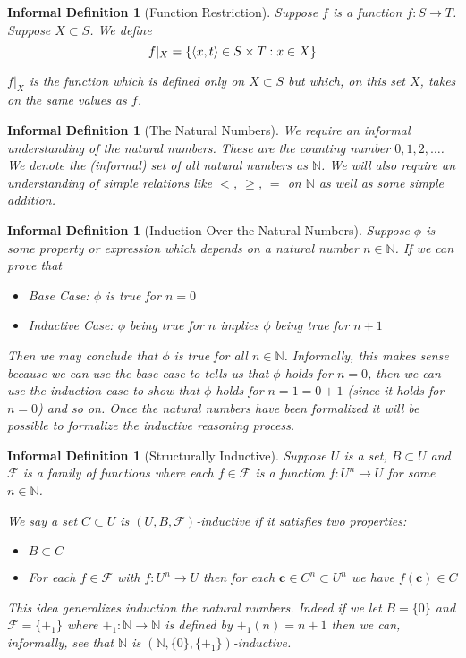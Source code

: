 \documentclass[12pt]{article}
\theoremstyle{break}
\theoremstyle{break}
\theoremstyle{break}
\theoremstyle{break}
\theoremstyle{break}
\newtheorem{informal definition}[definition]{Informal Definition}
\newcommand{\bv}[1]{\boldsymbol{#1}}
\begin{document}
\begin{informal definition}[Function Restriction]
Suppose $f$ is a function $f:S \to T$.
Suppose $X\subset S$.
We define
$$
f|_X = \{\braket{x, t} \in S\times T: x\in X\}
$$

$f|_X$ is the function which is defined only on $X\subset S$ but which, on this set $X$, takes on the same values as $f$.
\end{informal definition}

\begin{informal definition}[The Natural Numbers]
We require an informal understanding of the natural numbers.
These are the counting number $0, 1, 2, \ldots$.
We denote the (informal) set of all natural numbers as $\mathbb{N}$.
We will also require an understanding of simple relations like $<$, $\ge$, $=$ on $\mathbb{N}$ as well as some simple addition.
\end{informal definition}

\begin{informal definition}[Induction Over the Natural Numbers]
Suppose $\phi$ is some property or expression which depends on a natural number $n\in \mathbb{N}$.
If we can prove that
\begin{itemize}
\item{Base Case: $\phi$ is true for $n=0$}
\item{Inductive Case: $\phi$ being true for $n$ implies $\phi$ being true for $n+1$}
\end{itemize}
Then we may conclude that $\phi$ is true for all $n\in \mathbb{N}$.
Informally, this makes sense because we can use the base case to tells us that $\phi$ holds for $n=0$, then we can use the induction case to show that $\phi$ holds for $n=1 = 0+1$ (since it holds for $n=0$) and so on.
Once the natural numbers have been formalized it will be possible to formalize the inductive reasoning process.
\end{informal definition}

\begin{informal definition}[Structurally Inductive]
Suppose $U$ is a set, $B\subset U$ and $\mathcal{F}$ is a family of functions where each $f\in \mathcal{F}$ is a function $f:U^n \to U$ for some $n\in \mathbb{N}$.

We say a set $C\subset U$ is $(U, B, \mathcal{F})$-inductive if it satisfies two properties:
\begin{itemize}
\item{$B \subset C$}
\item{For each $f\in \mathcal{F}$ with $f:U^n \to U$ then for each $\bv{c}\in C^n \subset U^n$ we have $f(\bv{c}) \in C$}
\end{itemize}

This idea generalizes induction the natural numbers.
Indeed if we let $B= \{0\}$ and $\mathcal{F} = \{+_1\}$ where $+_1: \mathbb{N} \to \mathbb{N}$ is defined by $+_1(n) = n+1$ then we can, informally, see that $\mathbb{N}$ is $(\mathbb{N}, \{0\}, \{+_1\})$-inductive.

\end{informal definition}
\end{document}
